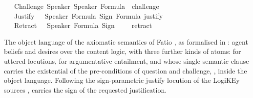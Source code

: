 \begin{isabellebody}
\ \ {\isacharbar}{\kern0pt}\ Challenge\ Speaker\ Speaker\ Formula\ \ {\isacharparenleft}{\kern0pt}{\isachardoublequoteopen}challenge{\isacharbrackleft}{\kern0pt}{\isacharunderscore}{\kern0pt}{\isacharcomma}{\kern0pt}{\isacharunderscore}{\kern0pt}{\isacharcomma}{\kern0pt}{\isacharunderscore}{\kern0pt}{\isacharbrackright}{\kern0pt}{\isachardoublequoteclose}{\isacharparenright}{\kern0pt}\isanewline
\ \ {\isacharbar}{\kern0pt}\ Justify\ \ \ Speaker\ Formula\ Sign\ Formula\ {\isacharparenleft}{\kern0pt}{\isachardoublequoteopen}justify{\isacharbrackleft}{\kern0pt}{\isacharunderscore}{\kern0pt}{\isacharcomma}{\kern0pt}{\isacharunderscore}{\kern0pt}{\isasymturnstile}\isactrlsup {\isacharunderscore}{\kern0pt}{\isacharunderscore}{\kern0pt}{\isacharbrackright}{\kern0pt}{\isachardoublequoteclose}{\isacharparenright}{\kern0pt}\isanewline
\ \ {\isacharbar}{\kern0pt}\ Retract\ \ \ Speaker\ Formula\ Sign\ \ \ \ \ {\isacharparenleft}{\kern0pt}{\isachardoublequoteopen}retract{\isacharbrackleft}{\kern0pt}{\isacharunderscore}{\kern0pt}{\isacharcomma}{\kern0pt}{\isacharunderscore}{\kern0pt}{\isacharcomma}{\kern0pt}{\isacharunderscore}{\kern0pt}{\isacharbrackright}{\kern0pt}{\isachardoublequoteclose}{\isacharparenright}{\kern0pt}%
\isadelimdocument
%
\endisadelimdocument
%
\isatagdocument
%
\isamarkuptrue%
%
\endisatagdocument
{\isafolddocument}%
%
\isadelimdocument
%
\endisadelimdocument
%
\begin{isamarkuptext}%
The object language of the axiomatic semantics of Fatio
\cite{McBurneyParsons2005}, as formalised in \cite{PasettoBenzmueller2024}: agent beliefs  and
desires  over the content logic, with three further kinds of atoms: 
for uttered locutions,  for argumentative entailment, and  whose
single semantic clause carries the existential of the pre-conditions of question
and challenge, , inside the object language. Following
the sign-parametric justify locution of the LogiKEy sources \cite{LogiKEy2020},  carries the
sign of the requested justification.%
\end{isamarkuptext}\isamarkuptrue%
\isamarkupfalse%

\end{isabellebody}
